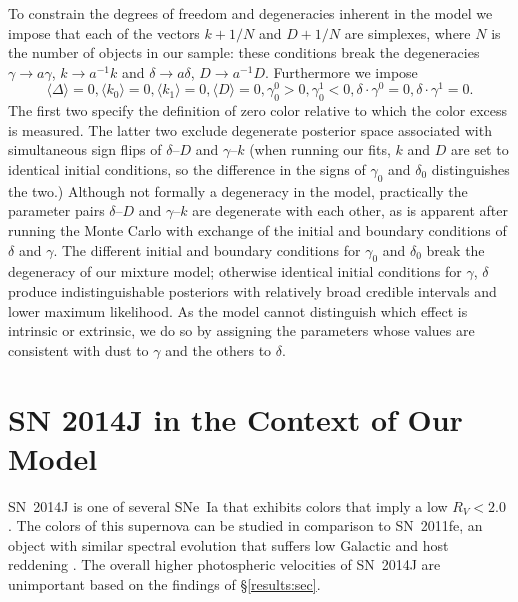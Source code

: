 \documentclass{aastex61}   	%
\begin{document}
To constrain the degrees of freedom and degeneracies inherent in the model we impose that
\color{red}
each of the vectors $k+1/N$ and $D+1/N$ are simplexes, where $N$ is the number of objects in our sample: these
conditions break the 
degeneracies  $\gamma \rightarrow a\gamma$, $k \rightarrow a^{-1}k$ and $\delta \rightarrow a\delta$, $D \rightarrow a^{-1}D$.
Furthermore we impose
\color{black} 
\begin{equation}
\langle \Delta \rangle=0, \langle k_0 \rangle=0, \langle k_1 \rangle=0, \langle D \rangle=0, \gamma^0_{0} > 0, \gamma^1_{0} < 0, \delta \cdot \gamma^0=0, \delta \cdot \gamma^1=0.
\end{equation}
The first two specify the definition of zero color relative to which the color excess is measured.    The latter two exclude degenerate posterior space
associated
with  simultaneous sign flips of
$\delta$--$D$ and $\gamma$--$k$
\color{red}
(when running our fits, $k$ and $D$ are set to
identical initial conditions, so the difference in the signs of $\gamma_0$ and $\delta_0$ distinguishes the two.)
Although not formally a degeneracy in the model, practically the parameter pairs  $\delta$--$D$ and $\gamma$--$k$ are degenerate with
each other, as is apparent after 
running the Monte Carlo with exchange of the initial  and boundary conditions of $\delta$ and $\gamma$.
The different initial and boundary conditions for $\gamma_0$ and $\delta_0$ break the degeneracy of our mixture model;
otherwise identical initial conditions for $\gamma$, $\delta$ produce indistinguishable posteriors
with relatively broad credible intervals and lower maximum likelihood.
\color{black}
As the model cannot distinguish which effect is intrinsic or extrinsic, we do so
by assigning the parameters whose values are consistent with dust to $\gamma$ and the others to $\delta$.



\section{SN 2014J in the Context of Our Model}
\label{sn2014j:sec}

SN~2014J   is one of several SNe~Ia that exhibits colors that imply a low $R_V<2.0$ \citep{2014ApJ...788L..21A, 2014MNRAS.443.2887F, 
2014arXiv1411.3332J,
2014ApJ...795L...4K, 2015ApJ...805...74B}.
The colors of this supernova can be studied in comparison to SN~2011fe, an object with similar
spectral evolution that 
suffers low Galactic and host reddening
\citep[this technique has been used in][]{2006MNRAS.369.1880E,2007AJ....133...58K,2008MNRAS.384..107E,2010AJ....139..120F, 2014ApJ...788L..21A}.
The overall higher photospheric velocities of
SN~2014J are unimportant  based on the findings of  \S\ref{results:sec}.
\end{document}
